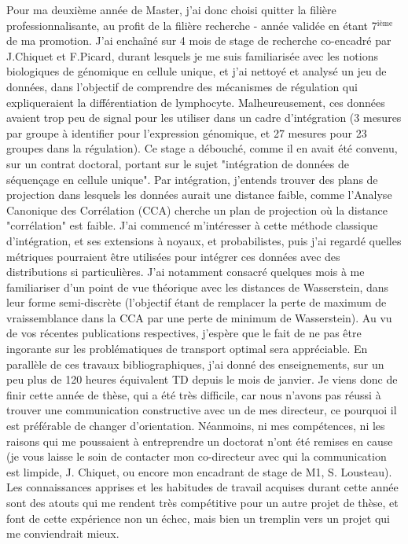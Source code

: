 \documentclass[a4paper,12pt]{article}
\begin{document}
Pour ma deuxième année de Master, j'ai donc choisi quitter la filière professionnalisante, au profit de la filière recherche - année validée en étant 7$^{\text{ième}}$ de ma promotion. 
J'ai enchaîné sur 4 mois de stage de recherche co-encadré par J.Chiquet et F.Picard, durant lesquels je me suis familiarisée avec les notions biologiques de génomique en cellule unique, et j'ai nettoyé et analysé un jeu de données, dans l'objectif de comprendre des mécanismes de régulation qui expliqueraient la différentiation de lymphocyte. Malheureusement, ces données avaient trop peu de signal pour les utiliser dans un cadre d'intégration (3 mesures par groupe à identifier pour l'expression génomique, et 27 mesures pour 23 groupes dans la régulation). Ce stage a débouché, comme il en avait été convenu, sur un contrat doctoral, portant sur le sujet "intégration de données de séquençage en cellule unique". 
Par intégration, j'entends trouver des plans de projection dans lesquels les données aurait une distance faible, comme l'Analyse Canonique des Corrélation (CCA) cherche un plan de projection où la distance "corrélation" est faible. J'ai commencé m'intéresser à cette méthode classique d'intégration, et ses extensions à noyaux, et probabilistes, puis j'ai regardé quelles métriques pourraient être utilisées pour intégrer ces données avec des distributions si particulières. J'ai notamment consacré quelques mois à me familiariser d'un point de vue théorique avec les distances de Wasserstein, dans leur forme semi-discrète (l'objectif étant de remplacer la perte de maximum de vraissemblance dans la CCA par une perte de minimum de Wasserstein). Au vu de vos récentes publications respectives, j'espère que le fait de ne pas être ingorante sur les problématiques de transport optimal sera appréciable. 
En parallèle de ces travaux bibliographiques, j'ai donné des enseignements, sur un peu plus de 120 heures équivalent TD depuis le mois de janvier. 
Je viens donc de finir cette année de thèse, qui a été très difficile, car nous n'avons pas réussi à trouver une communication constructive avec un de mes directeur, ce pourquoi il est préférable de changer d'orientation. 
Néanmoins, ni mes compétences, ni les raisons qui me poussaient à entreprendre un doctorat n'ont été remises en cause (je vous laisse le soin de contacter mon co-directeur avec qui la communication est limpide, J. Chiquet, ou encore mon encadrant de stage de M1, S. Lousteau). 
Les connaissances apprises et les habitudes de travail acquises durant cette année sont des atouts qui me rendent très compétitive pour un autre projet de thèse, et font de cette expérience non un échec, mais bien un tremplin vers un projet qui me conviendrait mieux. 
\end{document}
